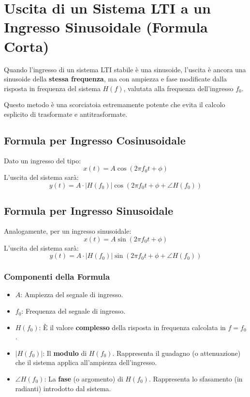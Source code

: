 \section{Uscita di un Sistema LTI a un Ingresso Sinusoidale (Formula Corta)}
Quando l'ingresso di un sistema LTI stabile è una sinusoide, l'uscita è ancora una sinusoide della \textbf{stessa frequenza}, ma con ampiezza e fase modificate dalla risposta in frequenza del sistema $H(f)$, valutata alla frequenza dell'ingresso $f_0$.

Questo metodo è una scorciatoia estremamente potente che evita il calcolo esplicito di trasformate e antitrasformate.

\subsection{Formula per Ingresso Cosinusoidale}
Dato un ingresso del tipo:
\begin{equation*}
    x(t) = A \cos(2\pi f_0 t + \phi)
\end{equation*}
L'uscita del sistema sarà:
\begin{equation*}
    y(t) = A \cdot |H(f_0)| \cos(2\pi f_0 t + \phi + \angle H(f_0))
\end{equation*}

\subsection{Formula per Ingresso Sinusoidale}
Analogamente, per un ingresso sinusoidale:
\begin{equation*}
    x(t) = A \sin(2\pi f_0 t + \phi)
\end{equation*}
L'uscita del sistema sarà:
\begin{equation*}
    y(t) = A \cdot |H(f_0)| \sin(2\pi f_0 t + \phi + \angle H(f_0))
\end{equation*}

\subsubsection{Componenti della Formula}
\begin{itemize}
    \item \textbf{$A$}: Ampiezza del segnale di ingresso.
    \item \textbf{$f_0$}: Frequenza del segnale di ingresso.
    \item \textbf{$H(f_0)$}: È il valore \textbf{complesso} della risposta in frequenza calcolata in $f=f_0$.
    \item \textbf{$|H(f_0)|$}: Il \textbf{modulo} di $H(f_0)$. Rappresenta il guadagno (o attenuazione) che il sistema applica all'ampiezza dell'ingresso.
    \item \textbf{$\angle H(f_0)$}: La \textbf{fase} (o argomento) di $H(f_0)$. Rappresenta lo sfasamento (in radianti) introdotto dal sistema.
\end{itemize}

